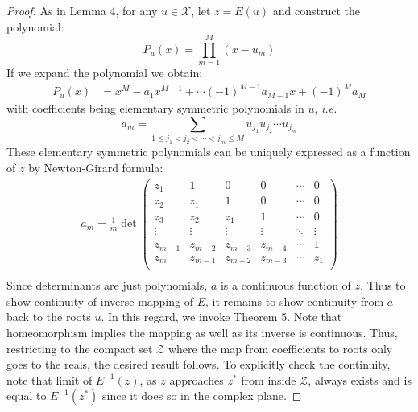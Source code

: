 \documentclass{article}
\newcommand{\latinphrase}[1]{\emph{#1}}    %
\newcommand{\ie}{\latinphrase{i.e.}\xspace}
\begin{document}
\begin{proof}
As in Lemma 4, for any $u \in \mathcal{X}$, let $z=E(u)$ and construct the polynomial:
\begin{equation}
P_u(x) = \prod_{m=1}^M (x-u_m)
\end{equation}
If we expand the polynomial we obtain:
\begin{equation}
\begin{aligned}
P_u(x) &= x^M - a_1x^{M-1} + \cdots (-1)^{M-1} a_{M-1}x + (-1)^{M} a_M
\end{aligned}
\end{equation}
with coefficients being elementary symmetric polynomials in $u$, \ie
\begin{equation}
a_m = \sum_{1\leq j_1 < j_2 < \cdots < j_m \leq M  } u_{j_1}u_{j_2}\cdots u_{j_m}
\end{equation}
These elementary symmetric polynomials can be uniquely expressed 
as a function of $z$ by Newton-Girard formula:
\begin{equation}
\begin{aligned}
a_m = \frac{1}{m} \det \left( \begin{array}{cccccc}
z_1 & 1 & 0 & 0 & \cdots & 0 \\
z_2 & z_1 & 1 & 0 & \cdots & 0 \\
z_3 & z_2 & z_1 & 1 & \cdots & 0 \\
\vdots & \vdots & \vdots & \vdots & \ddots & \vdots \\
z_{m-1} & z_{m-2} & z_{m-3} & z_{m-4} & \cdots & 1 \\
z_m & z_{m-1} & z_{m-2} & z_{m-3} & \cdots & z_1 \\
\end{array} \right)\\
\end{aligned}
\end{equation}
Since determinants are just polynomials, $a$ is a continuous function of $z$. Thus to show continuity of inverse mapping of $E$, it remains to show continuity from $a$ back to the roots $u$. In this regard, we invoke Theorem 5. Note that homeomorphism implies the mapping as well as its inverse is continuous. Thus, restricting to the compact set $\mathcal{Z}$ where the map from coefficients to roots only goes to the reals, the desired result follows. To explicitly check the continuity, note that limit of $E^{-1}(z)$, as $z$ approaches $z^*$ from inside $\mathcal{Z}$, always exists and is equal to $E^{-1}(z^*)$ since it does so in the complex plane.
\end{proof}
\end{document}
